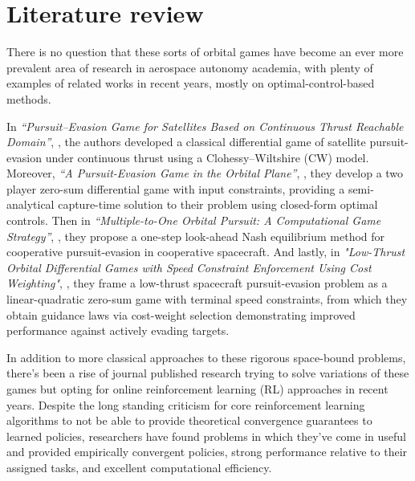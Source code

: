 \chapter{Literature review}

There is no question that these sorts of orbital games have become an ever more prevalent area of research in aerospace autonomy academia, with plenty of examples of related works in recent years, mostly on optimal-control-based methods.

In \textit{“Pursuit--Evasion Game for Satellites Based on Continuous Thrust Reachable Domain”}, \cite{gong2020continuousthrust}, the authors developed a classical differential game of satellite pursuit-evasion under continuous thrust using a Clohessy--Wiltshire (CW) model. Moreover, \textit{“A Pursuit-Evasion Game in the Orbital Plane”}, \cite{selvakumar2017orbitalplane}, they develop a two player zero-sum differential game with input constraints, providing a semi-analytical capture-time solution to their problem using closed-form optimal controls. Then in \textit{“Multiple-to-One Orbital Pursuit: A Computational Game Strategy”}, \cite{liu2025multipletoone}, they propose a one-step look-ahead Nash equilibrium method for cooperative pursuit-evasion in cooperative spacecraft. And lastly, in \textit{"Low-Thrust Orbital Differential Games with Speed Constraint Enforcement Using Cost Weighting"}, \cite{drucker2026lowthrustgames}, they frame a low-thrust spacecraft pursuit-evasion problem as a linear-quadratic zero-sum game with terminal speed constraints, from which they obtain guidance laws via cost-weight selection demonstrating improved performance against actively evading targets.


In addition to more classical approaches to these rigorous space-bound problems, there’s been a rise of journal published research trying to solve variations of these games but opting for online reinforcement learning (RL) approaches in recent years. Despite the long standing criticism for core reinforcement learning algorithms to not be able to provide theoretical convergence guarantees to learned policies, researchers have found problems in which they've come in useful and provided empirically convergent policies, strong performance relative to their assigned tasks, and excellent computational efficiency.


